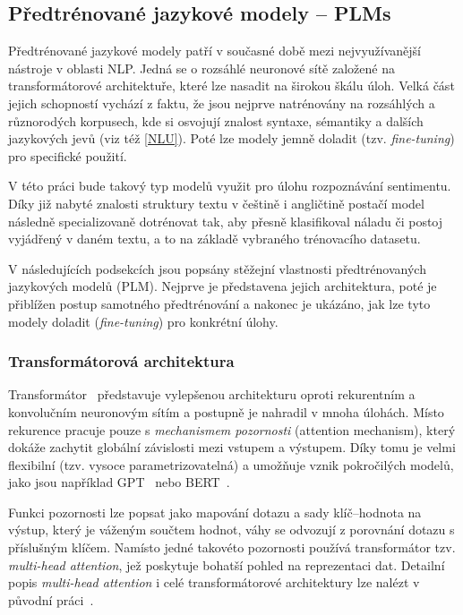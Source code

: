 \subsection{Předtrénované jazykové modely -- PLMs}\label{PLMs}
Předtrénované jazykové modely patří v současné době mezi nejvyužívanější nástroje v oblasti NLP. Jedná se o rozsáhlé neuronové sítě založené na transformátorové architektuře, které lze nasadit na širokou škálu úloh. Velká část jejich schopností vychází z faktu, že jsou nejprve natrénovány na rozsáhlých a různorodých korpusech, kde si osvojují znalost syntaxe, sémantiky a dalších jazykových jevů (viz též \ref{NLU}). Poté lze modely jemně doladit (tzv. \emph{fine-tuning}) pro specifické použití.~\cite{Wei_2024, zhou2023comprehensivesurveypretrainedfoundation, min2021recentadvancesnaturallanguage, Elazar2021}

V této práci bude takový typ modelů využit pro úlohu rozpoznávání sentimentu. Díky již nabyté znalosti struktury textu v češtině i angličtině postačí model následně specializovaně dotrénovat tak, aby přesně klasifikoval náladu či postoj vyjádřený v daném textu, a to na základě vybraného trénovacího datasetu.

V následujících podsekcích jsou popsány stěžejní vlastnosti předtrénovaných jazykových modelů (PLM). Nejprve je představena jejich architektura, poté je přiblížen postup samotného předtrénování a nakonec je ukázáno, jak lze tyto modely doladit (\emph{fine-tuning}) pro konkrétní úlohy.

\subsubsection{Transformátorová architektura}\label{Transformator}
Transformátor~\cite{vaswani2023attentionneed} představuje vylepšenou architekturu oproti rekurentním a konvolučním neuronovým sítím a postupně je nahradil v mnoha úlohách. Místo rekurence pracuje pouze s \emph{mechanismem pozornosti} (attention mechanism), který dokáže zachytit globální závislosti mezi vstupem a výstupem. Díky tomu je velmi flexibilní (tzv. vysoce parametrizovatelná) a umožňuje vznik pokročilých modelů, jako jsou například GPT~\cite{radford2018improving} nebo BERT~\cite{devlin2019bert}.

Funkci pozornosti lze popsat jako mapování dotazu a sady klíč--hodnota na výstup, který je váženým součtem hodnot, váhy se odvozují z porovnání dotazu s příslušným klíčem. Namísto jedné takovéto pozornosti používá transformátor tzv. \emph{multi-head attention}, jež poskytuje bohatší pohled na reprezentaci dat. Detailní popis \emph{multi-head attention} i celé transformátorové architektury lze nalézt v původní práci~\cite{vaswani2023attentionneed}.


